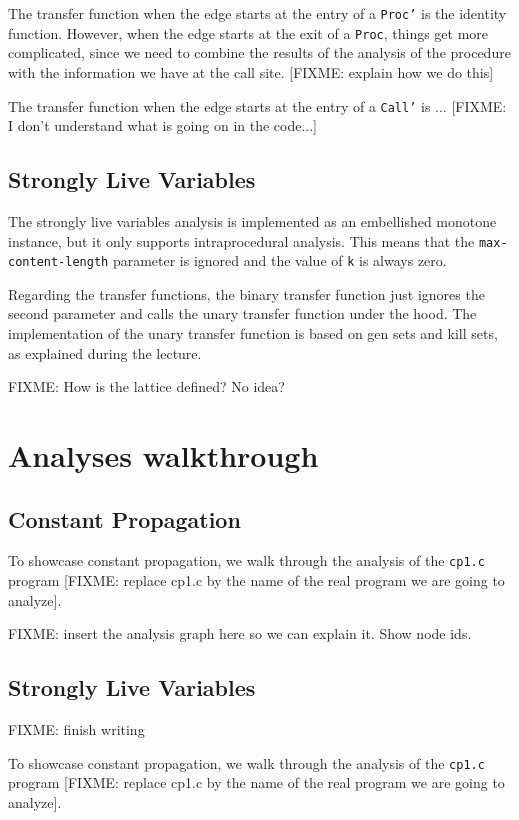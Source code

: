 \documentclass{article}
\begin{document}
The transfer function when the edge starts at the entry of a \texttt{Proc'} is the identity function. However, when the edge starts at the exit of a \texttt{Proc}, things get more complicated, since we need to combine the results of the analysis of the procedure with the information we have at the call site. [FIXME: explain how we do this]

The transfer function when the edge starts at the entry of a \texttt{Call'} is ... [FIXME: I don't understand what is going on in the code...]

\subsection*{Strongly Live Variables}

The strongly live variables analysis is implemented as an embellished monotone instance, but it only supports intraprocedural analysis. This means that the \texttt{max-content-length} parameter is ignored and the value of \texttt{k} is always zero.

Regarding the transfer functions, the binary transfer function just ignores the second parameter and calls the unary transfer function under the hood. The implementation of the unary transfer function is based on gen sets and kill sets, as explained during the lecture.

FIXME: How is the lattice defined? No idea?

\section{Analyses walkthrough}

\subsection*{Constant Propagation}

To showcase constant propagation, we walk through the analysis of the \texttt{cp1.c} program [FIXME: replace cp1.c by the name of the real program we are going to analyze].

FIXME: insert the analysis graph here so we can explain it. Show node ids.

\subsection*{Strongly Live Variables}

FIXME: finish writing

To showcase constant propagation, we walk through the analysis of the \texttt{cp1.c} program [FIXME: replace cp1.c by the name of the real program we are going to analyze].
\end{document}
